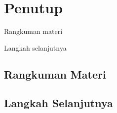 \chapter{Penutup}

\begin{dibabini}
  \item Rangkuman materi
  \item Langkah selanjutnya
\end{dibabini}

\section{Rangkuman Materi}

\section{Langkah Selanjutnya}
